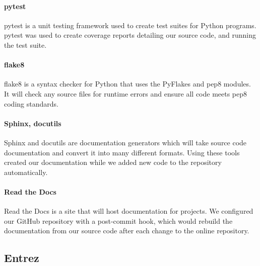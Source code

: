 \documentclass{bioinfo}
\begin{document}
\paragraph{pytest\textcolon} 
pytest is a unit testing framework used to create test suites for Python programs. pytest was used to create coverage reports detailing our source code, and running the test suite.

\paragraph{flake8\textcolon} 
flake8 is a syntax checker for Python that uses the PyFlakes and pep8 modules. It will check any source files for runtime errors and ensure all code meets pep8 coding standards.
    
\paragraph{Sphinx, docutils\textcolon}
Sphinx and docutils are documentation generators which will take source code documentation and convert it into many different formats. Using these tools created our documentation while we added new code to the repository automatically.

\paragraph{Read the Docs\textcolon} 
Read the Docs is a site that will host documentation for projects. We configured our GitHub repository with a post-commit hook, which would rebuild the documentation from our source code after each change to the online repository.
      
\subsection{Entrez}
\end{document}
